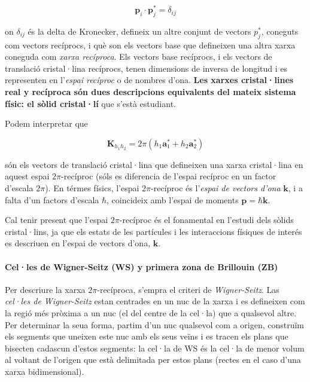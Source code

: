 \documentclass[12pt]{article} %
\let\vec\mathbf %
\begin{document}
\begin{equation}
\label{eq:rec1}
\vec p_i\cdot\vec p_j^{*}=\delta_{ij}
\end{equation}

on $\delta_{ij}$ és la delta de Kronecker, defineix un altre conjunt de vectors $p_j^*$, coneguts com vectors recíprocs, i què son els vectors base que defineixen una altra xarxa coneguda com \textit{xarxa recíproca}. Els  vectors base recíprocs, i els vectors de translació cristal·lina recíprocs, tenen dimensions de inversa de longitud i es representen en l'\textit{espai recíproc} o de nombres d'ona. \textbf{Les xarxes cristal·lines real y recíproca són dues descripcions equivalents del mateix sistema físic: el sòlid cristal·lí} que s'està estudiant.

Podem interpretar que 

\begin{equation}
\label{eq:rec3}
\vec K_{h_1h_2}=2\pi\left(h_1\vec a_1^{*}+h_2\vec a_2^{*}\right)
\end{equation}

són els vectors de translació cristal·lina que defineixen una xarxa cristal·lina en aquest espai $2\pi$-recíproc (sóls es diferencia de l'espai recíproc en un factor d'escala $2\pi$). En térmes físics, l'espai $2\pi$-recíproc és l'\emph{espai de vectors d'ona} $\vec k$, i a falta d'un factors d'escala $\hbar$, coincideix amb l'espai de moments  $\vec p=\hbar\vec k$.

Cal tenir present que l'espai $2\pi$-recíproc és el fonamental en l'estudi dels sòlids cristal·lins, ja que els estats de les partícules i les interaccions físiques de interés es descriuen en l'espai de vectors d'ona, $\vec k$.


\paragraph{Cel·les de Wigner-Seitz (WS) y primera zona de Brillouin (ZB)}

Per descriure la xarxa $2\pi$-recíproca, s'empra el criteri de \textit{Wigner-Seitz}. Las \textit{cel·les de Wigner-Seitz} estan centrades en un nuc de la xarxa i es defineixen com la regió més pròxima a un nuc (el del centre de la cel·la) que a qualsevol altre. Per determinar la seua forma, partim d'un nuc qualsevol com a origen, construïm els segments que uneixen este nuc amb els seus veïns i es tracen els plans que bisecten cadascun d'estos segments: la cel·la de WS és la cel·la de menor volum al voltant de l'origen que està delimitada per estos plans (rectes en el caso d'una xarxa bidimensional).
\end{document}
